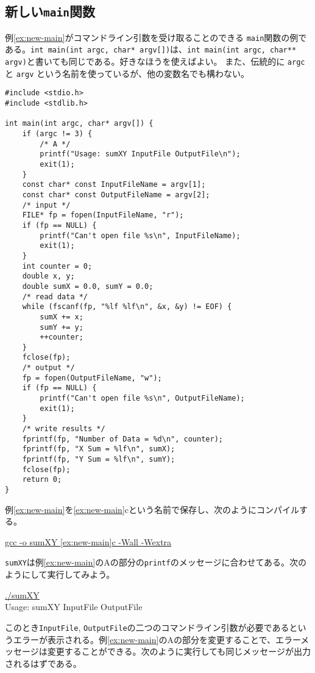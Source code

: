 \subsection{新しい\texttt{main}関数}

例\ref{ex:new-main}がコマンドライン引数を受け取ることのできる \texttt{main}関数の例である。\texttt{int main(int argc, char* argv[])}は、\texttt{int main(int argc, char** argv)}と書いても同じである。好きなほうを使えばよい。
また、伝統的に \texttt{argc} と \texttt{argv} という名前を使っているが、他の変数名でも構わない。
\begin{reidai}\label{ex:new-main}
    \begin{verbatim}
#include <stdio.h>
#include <stdlib.h>

int main(int argc, char* argv[]) {
    if (argc != 3) {
        /* A */
        printf("Usage: sumXY InputFile OutputFile\n");
        exit(1);
    }
    const char* const InputFileName = argv[1];
    const char* const OutputFileName = argv[2];
    /* input */
    FILE* fp = fopen(InputFileName, "r");
    if (fp == NULL) {
        printf("Can't open file %s\n", InputFileName);
        exit(1);
    }
    int counter = 0;
    double x, y;
    double sumX = 0.0, sumY = 0.0;
    /* read data */
    while (fscanf(fp, "%lf %lf\n", &x, &y) != EOF) {
        sumX += x;
        sumY += y;
        ++counter;
    }
    fclose(fp);
    /* output */
    fp = fopen(OutputFileName, "w");
    if (fp == NULL) {
        printf("Can't open file %s\n", OutputFileName);
        exit(1);
    }
    /* write results */
    fprintf(fp, "Number of Data = %d\n", counter);
    fprintf(fp, "X Sum = %lf\n", sumX);
    fprintf(fp, "Y Sum = %lf\n", sumY);
    fclose(fp);
    return 0;
}
\end{verbatim}
\end{reidai} \noindent
例\ref{ex:new-main}を\ref{ex:new-main}cという名前で保存し、次のようにコンパイルする。
\begin{commandline2}
    \prompt \underline{gcc -o sumXY \ref{ex:new-main}c -Wall -Wextra}
\end{commandline2} \noindent
\texttt{sumXY}は例\ref{ex:new-main}のAの部分の\texttt{printf}のメッセージに合わせてある。次のようにして実行してみよう。
\begin{commandline2}
    \prompt \underline{./sumXY}\\
    Usage: sumXY InputFile OutputFile
\end{commandline2} \noindent
このとき\texttt{InputFile}, \texttt{OutputFile}の二つのコマンドライン引数が必要であるというエラーが表示される。例\ref{ex:new-main}のAの部分を変更することで、エラーメッセージは変更することができる。次のように実行しても同じメッセージが出力されるはずである。
